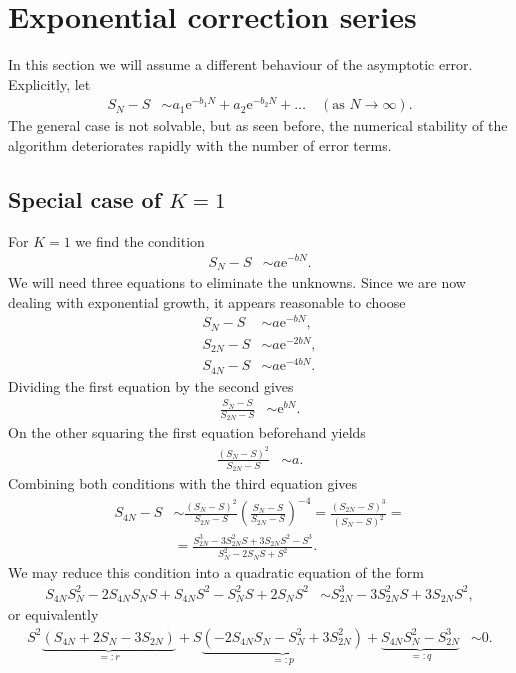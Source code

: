 \documentclass[english, parskip=full]{scrartcl}
\newcommand{\kla}{}
\newcommand{\tecxt}{}
\newcommand{\e}{\text{e}}
\begin{document}
\section{Exponential correction series}
In this section we will assume a different behaviour of the asymptotic error.
Explicitly, let
\begin{align}
S_N - S &\sim a_1\e^{-b_1N} + a_2\e^{-b_2N} + \dots \quad (\tecxt\text{as } N\rightarrow\infty ).
\end{align}
The general case is not solvable, but as seen before, the numerical stability of the algorithm deteriorates rapidly with the number of error terms.

\subsection{Special case of $K=1$}
For $K=1$ we find the condition
\begin{align}
S_N - S &\sim a\e^{-bN}.
\end{align}
We will need three equations to eliminate the unknowns.
Since we are now dealing with exponential growth, it appears reasonable to choose 
\begin{align}
S_N - S &\sim a\e^{-bN},\\
S_{2N} - S &\sim a\e^{-2bN},\\
S_{4N} - S &\sim a\e^{-4bN}.
\end{align}
Dividing the first equation by the second gives
\begin{align}
\frac{S_N - S}{S_{2N} - S} &\sim \e^{bN}.
\end{align}
On the other squaring the first equation beforehand yields
\begin{align}
\frac{(S_N - S)^2}{S_{2N} - S} &\sim a.
\end{align}
Combining both conditions with the third equation gives
\begin{align}
S_{4N} - S &\sim \frac{(S_N - S)^2}{S_{2N} - S} \kla\left( \frac{S_N - S}{S_{2N} - S} \right)^{-4} = \frac{(S_{2N} - S)^3}{(S_N - S)^2} = \\
&= \frac{S_{2N}^3 - 3S_{2N}^2S + 3S_{2N}S^2 - S^3}{S_N^2 - 2S_NS + S^2}.
\end{align}
We may reduce this condition into a quadratic equation of the form
\begin{align}
S_{4N}S_N^2 - 2S_{4N}S_NS + S_{4N}S^2 - S_N^2S + 2S_NS^2 &\sim S_{2N}^3 - 3S_{2N}^2S + 3S_{2N}S^2,
\end{align}
or equivalently
\begin{align}
S^2 \underbrace{\kla\left( S_{4N} + 2S_N - 3S_{2N} \right)}_{=: r} + S \underbrace{ \kla\left( -2S_{4N}S_N - S_N^2 + 3S_{2N}^2 \right)}_{=: p} + \underbrace{S_{4N}S_N^2 - S_{2N}^3}_{=: q} &\sim 0.
\end{align}
\end{document}
